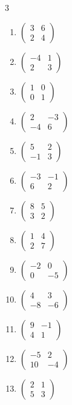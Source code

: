 \begin{multicols}{3}
\begin{enumerate}[label=\arabic*.,  leftmargin=*]
\item $\begin{pmatrix}3&6\\2&4\end{pmatrix}$
\item $\begin{pmatrix}-4&1\\2&3\end{pmatrix}$
\item $\begin{pmatrix}1&0\\0&1\end{pmatrix}$
\item $\begin{pmatrix}2&-3\\-4&6\end{pmatrix}$
\item $\begin{pmatrix}5&2\\-1&3\end{pmatrix}$
\item $\begin{pmatrix}-3&-1\\6&2\end{pmatrix}$
\item $\begin{pmatrix}8&5\\3&2\end{pmatrix}$
\item $\begin{pmatrix}1&4\\2&7\end{pmatrix}$
\item $\begin{pmatrix}-2&0\\0&-5\end{pmatrix}$
\item $\begin{pmatrix}4&3\\-8&-6\end{pmatrix}$
\item $\begin{pmatrix}9&-1\\4&1\end{pmatrix}$
\item $\begin{pmatrix}-5&2\\10&-4\end{pmatrix}$
\item $\begin{pmatrix}2&1\\5&3\end{pmatrix}$

\end{enumerate}
\end{multicols}
